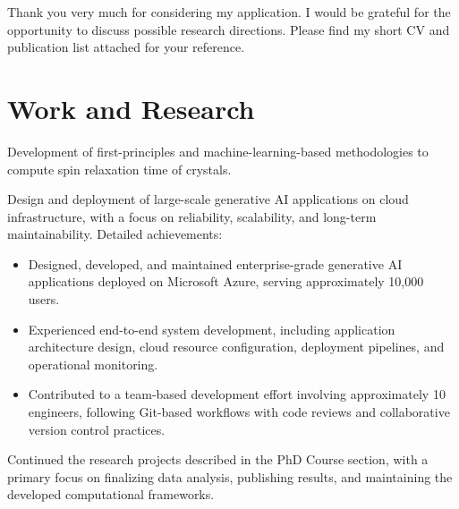 \documentclass[11pt,a4paper,sans,colorlinks,lualatex,article]{moderncv}        %
\begin{document}
Thank you very much for considering my application. I would be grateful for the opportunity to discuss possible research directions. Please find my short CV and publication list attached for your reference.

\makeletterclosing


% 
\clearpage

\makecvtitle

\section{Work and Research}
{Development of first-principles and machine-learning-based methodologies to compute spin relaxation time of crystals.}

{Design and deployment of large-scale generative AI applications on cloud infrastructure, with a focus on reliability, scalability, and long-term maintainability.\newline{}
Detailed achievements:
\begin{itemize}
  \item Designed, developed, and maintained enterprise-grade generative AI applications deployed on Microsoft Azure, serving approximately 10,000 users. 
  \item Experienced end-to-end system development, including application architecture design, cloud resource configuration, deployment pipelines, and operational monitoring.
  \item Contributed to a team-based development effort involving approximately 10 engineers, following Git-based workflows with code reviews and collaborative version control practices.
\end{itemize}}

{Continued the research projects described in the PhD Course section, with a primary focus on finalizing data analysis, publishing results, and maintaining the developed computational frameworks.}
\end{document}

